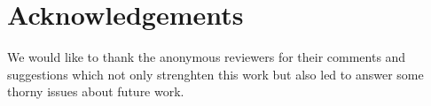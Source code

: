 
\section*{Acknowledgements}
We would like to thank the anonymous reviewers for their comments and
suggestions which not only strenghten this work but also led to answer some
thorny issues about future work.

